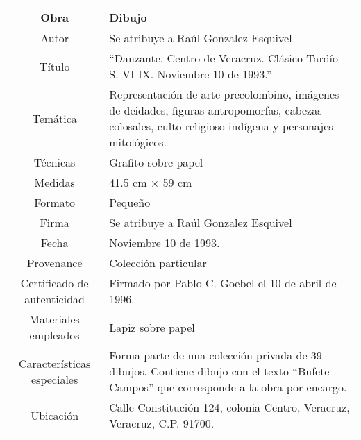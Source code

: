 \begin{table}[H]
\centering
\begin{tabular}{|c|m{}|}
\hline
Obra& Dibujo	\\
\hline
Autor & Se atribuye a Ra\'ul Gonzalez Esquivel\\
\hline
T\'itulo & ``Danzante. Centro de Veracruz. Cl\'asico Tard\'io S. VI-IX. Noviembre 10 de 1993.'' \\
\hline
Tem\'atica & Representaci\'on de arte precolombino, im\'agenes de deidades, figuras antropomorfas, cabezas colosales, culto religioso ind\'igena y personajes mitol\'ogicos.\\
\hline
T\'ecnicas &Grafito sobre papel \\
\hline
Medidas & 41.5 cm $\times$ 59 cm \\
\hline
 Formato & Peque\~no \\
 \hline
 Firma & Se atribuye a Ra\'ul Gonzalez Esquivel\\ 
 \hline
  Fecha & Noviembre 10 de 1993.\\
 \hline
 Provenance & Colecci\'on particular\\
 \hline
 Certificado de autenticidad& Firmado por Pablo C. Goebel el 10 de abril de 1996.  \\
 \hline 
  Materiales empleados & Lapiz sobre papel\\
 \hline
 Caracter\'isticas especiales & Forma parte de una colecci\'on privada de 39 dibujos. 
Contiene dibujo con el texto ``Bufete Campos'' que corresponde a la obra por encargo. \\
\hline 
Ubicaci\'on & Calle Constituci\'on 124, colonia Centro, Veracruz, Veracruz, C.P. 91700.\\
\hline

\end{tabular}
\end{table}

